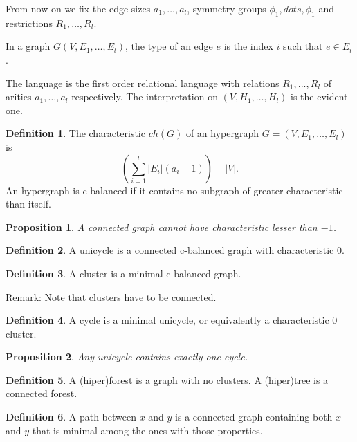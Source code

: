 \documentclass[11pt,notitlepage]{report}
\newtheorem{proposition}{Proposition}[chapter]
\theoremstyle{definition}
\newtheorem{definition}{Definition}[chapter]
\theoremstyle{remark}
\begin{document}
From now on we fix the edge sizes $a_1,\dots,a_l$, 
symmetry groups $\phi_1,dots,\phi_1$ and restrictions $R_1,\dots,R_l$. \par

In a graph $G(V,E_1,\dots, E_l)$, the type of an edge $e$ is the index
$i$ such that $e\in E_i$.  

The language is the first order relational 
language with relations $R_1,..., R_l$ of arities
$a_1,\dots, a_l$ respectively. The interpretation on 
$(V,H_1,\dots, H_l)$ is the evident one. \par

\begin{definition}
	The characteristic $ch(G)$ of an hypergraph $G=(V,E_1,\dots,E_l)$ is
	\[ \left( \sum_{i=1}^l |E_i|(a_i-1)\right) -	|V|  .\]
	An hypergraph is c-balanced if it contains no subgraph of
	greater characteristic than itself. 
\end{definition}

\begin{proposition}
	A connected graph cannot have characteristic lesser than $-1$.
\end{proposition}

\begin{definition}
	A unicycle is a connected c-balanced graph with characteristic $0$.
\end{definition}

\begin{definition} A cluster is a minimal c-balanced graph.
\end{definition}

Remark: Note that clusters have to be connected.
 
\begin{definition}
	A cycle is a minimal unicycle, or equivalently a characteristic $0$ cluster.  
\end{definition}

\begin{proposition}
	Any unicycle contains exactly one cycle. 
\end{proposition}

\begin{definition} 
	A (hiper)forest is a graph with no clusters. A (hiper)tree is a connected forest.
\end{definition}

\begin{definition} 
	A path between $x$ and $y$ is a connected graph containing both $x$ and $y$
	that is minimal among the ones with those properties. 
\end{definition}
\end{document}
